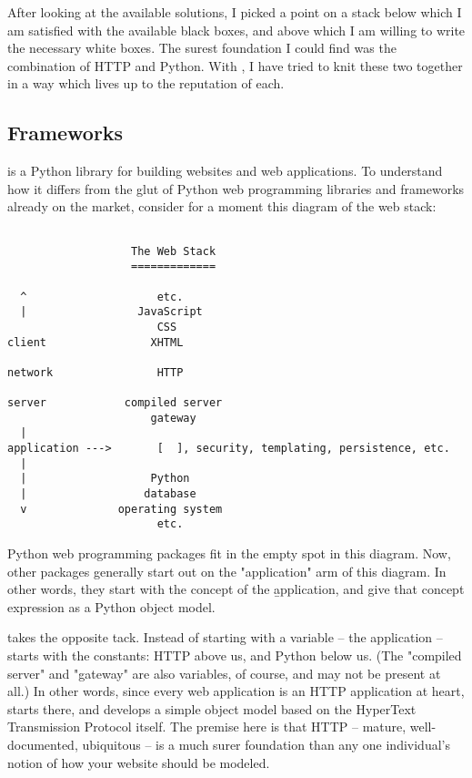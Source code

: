 After looking at the available solutions, I picked a point on a stack below
which I am satisfied with the available black boxes, and above which I am
willing to write the necessary white boxes. The surest foundation I could find
was the combination of HTTP and Python. With , I have tried to
knit these two together in a way which lives up to the reputation of each.


\subsection{Frameworks \label{frameworks}}

 is a Python library for building websites and web applications.
To understand how it differs from the glut of Python web programming libraries
and frameworks already on the market, consider for a moment this diagram of the
web stack:

\begin{verbatim}

                   The Web Stack
                   =============

  ^                    etc.
  |                 JavaScript
                       CSS
client                XHTML

network                HTTP

server            compiled server
                      gateway
  |
application --->       [  ], security, templating, persistence, etc.
  |
  |                   Python
  |                  database
  v              operating system
                       etc.

\end{verbatim}

Python web programming packages fit in the empty spot in this diagram. Now,
other packages generally start out on the "application" arm of this diagram. In
other words, they start with the concept of the \b{application}, and give that
concept expression as a Python object model.

 takes the opposite tack. Instead of starting with a variable --
the application --  starts with the constants: HTTP above us, and
Python below us. (The "compiled server" and "gateway" are also variables, of
course, and may not be present at all.) In other words, since every web
application is an HTTP application at heart,  starts there, and
develops a simple object model based on the HyperText Transmission Protocol
itself. The premise here is that HTTP -- mature, well-documented, ubiquitous --
is a much surer foundation than any one individual's notion of how your website
should be modeled.

